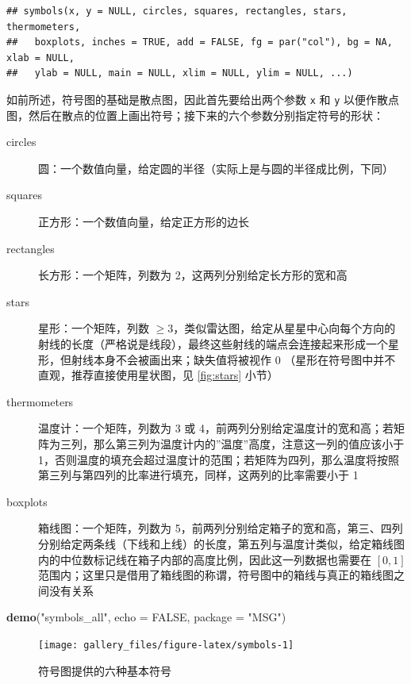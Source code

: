 \documentclass[
  b5paper,
  UTF8,twoside]{book}
\newenvironment{Shaded}{\begin{snugshade}}{\end{snugshade}}
\newcommand{\AttributeTok}[1]{\textcolor[rgb]{0.13,0.29,0.53}{#1}}
\newcommand{\ConstantTok}[1]{\textcolor[rgb]{0.56,0.35,0.01}{#1}}
\newcommand{\FunctionTok}[1]{\textcolor[rgb]{0.13,0.29,0.53}{\textbf{#1}}}
\newcommand{\NormalTok}[1]{#1}
\newcommand{\StringTok}[1]{\textcolor[rgb]{0.31,0.60,0.02}{#1}}
\begin{document}
\begin{verbatim}
## symbols(x, y = NULL, circles, squares, rectangles, stars, thermometers,
##   boxplots, inches = TRUE, add = FALSE, fg = par("col"), bg = NA, xlab = NULL,
##   ylab = NULL, main = NULL, xlim = NULL, ylim = NULL, ...)
\end{verbatim}

如前所述，符号图的基础是散点图，因此首先要给出两个参数 \texttt{x} 和 \texttt{y} 以便作散点图，然后在散点的位置上画出符号；接下来的六个参数分别指定符号的形状：

\begin{description}
\item[circles]
圆：一个数值向量，给定圆的半径（实际上是与圆的半径成比例，下同）
\item[squares]
正方形：一个数值向量，给定正方形的边长
\item[rectangles]
长方形：一个矩阵，列数为 2，这两列分别给定长方形的宽和高
\item[stars]
星形：一个矩阵，列数 \(\geq3\)，类似雷达图，给定从星星中心向每个方向的射线的长度（严格说是线段），最终这些射线的端点会连接起来形成一个星形，但射线本身不会被画出来；缺失值将被视作 0 （星形在符号图中并不直观，推荐直接使用星状图，见 \ref{fig:stars} 小节）
\item[thermometers]
温度计：一个矩阵，列数为 3 或 4，前两列分别给定温度计的宽和高；若矩阵为三列，那么第三列为温度计内的''温度''高度，注意这一列的值应该小于 1，否则温度的填充会超过温度计的范围；若矩阵为四列，那么温度将按照第三列与第四列的比率进行填充，同样，这两列的比率需要小于 1
\item[boxplots]
箱线图：一个矩阵，列数为 5，前两列分别给定箱子的宽和高，第三、四列分别给定两条线（下线和上线）的长度，第五列与温度计类似，给定箱线图内的中位数标记线在箱子内部的高度比例，因此这一列数据也需要在 \([0,1]\) 范围内；这里只是借用了箱线图的称谓，符号图中的箱线与真正的箱线图之间没有关系
\end{description}





\begin{Shaded}
\begin{Highlighting}[]
\FunctionTok{demo}\NormalTok{(}\StringTok{"symbols\_all"}\NormalTok{, }\AttributeTok{echo =} \ConstantTok{FALSE}\NormalTok{, }\AttributeTok{package =} \StringTok{"MSG"}\NormalTok{)}
\end{Highlighting}
\end{Shaded}

\begin{figure}

{\centering \texttt{[image: gallery\_files/figure-latex/symbols-1]} 

}

\caption[符号图提供的六种基本符号]{符号图提供的六种基本符号}\label{fig:symbols}
\end{figure}
\end{document}
